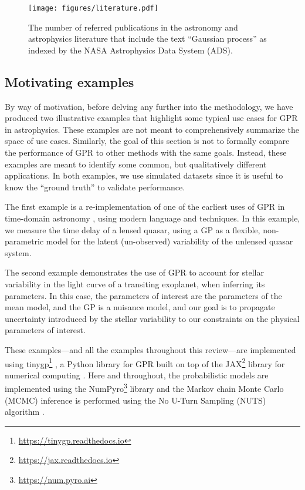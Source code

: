 \documentclass[letterpaper]{ar-1col}
\newcommand{\project}[1]{\textsf{#1}}
\begin{document}
\begin{figure}[ht]
  \centering
  \texttt{[image: figures/literature.pdf]}
  \caption{The number of referred publications in the astronomy and astrophysics literature that include the text ``Gaussian process'' as indexed by the NASA Astrophysics Data System (ADS). }
  \label{fig:literature}
\end{figure}

\subsection{Motivating examples}
\label{sec:sim_examples}

By way of motivation, before delving any further into the methodology, we have produced two illustrative examples that highlight some typical use cases for GPR in astrophysics.
These examples are not meant to comprehensively summarize the space of use cases.
Similarly, the goal of this section is not to formally compare the performance of GPR to other methods with the same goals.
Instead, these examples are meant to identify some common, but qualitatively different applications.
In both examples, we use simulated datasets since it is useful to know the ``ground truth'' to validate performance.

The first example is a re-implementation of one of the earliest uses of GPR in time-domain astronomy \citep{prh92a}, using modern language and techniques.
In this example, we measure the time delay of a lensed quasar, using a GP as a flexible, non-parametric model for the latent (un-observed) variability of the unlensed quasar system.

The second example demonstrates the use of GPR to account for stellar variability in the light curve of a transiting exoplanet, when inferring its parameters.
In this case, the parameters of interest are the parameters of the mean model, and the GP is a nuisance model, and our goal is to propagate uncertainty introduced by the stellar variability to our constraints on the physical parameters of interest.

These examples---and all the examples throughout this review---are implemented using \textsf{tinygp}\footnote{\url{https://tinygp.readthedocs.io}} \citep{tinygp}, a \project{Python} library for GPR built on top of the \project{JAX}\footnote{\url{https://jax.readthedocs.io}} library for numerical computing \citep{jax}.
Here and throughout, the probabilistic models are implemented using the \project{NumPyro}\footnote{\url{https://num.pyro.ai}} library \citep{numpyro} and the Markov chain Monte Carlo (MCMC) inference is performed using the No U-Turn Sampling (NUTS) algorithm \citep{Hoffman:2014}.
\end{document}
